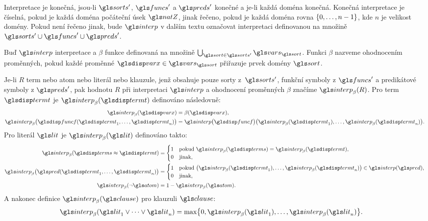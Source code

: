Interpretace je konečná, jsou-li $\sorts'$, $\funcs'$ a $\preds'$
konečné a je-li každá doména konečná.
Konečná interpretace je číselná, pokud je každá doména
počáteční úsek $\natZ$, jinak řečeno, pokud je každá doména rovna
$\{ 0 , \ldots, n - 1 \}$, kde $n$ je velikost domény.
Pokud není řečeno jinak, bude
$\interp$ v dalším textu označovat interpretaci definovanou
na množině $\sorts' \cup \funcs' \cup \preds'$.

Buď $\interp$ interpretace a $\beta$ funkce definovaná na množině
$\bigcup_{\sort \in \sorts'} \vars_\sort$. Funkci $\beta$ nazveme ohodnocením
proměnných, pokud každé proměnné $\var \in \vars_\sort$ přiřazuje
prvek domény $\sort$.

Je-li $R$ term nebo atom nebo literál nebo klauzule, jenž
obsahuje pouze sorty z~$\sorts'$, funkční symboly z $\funcs'$ a
predikátové symboly z $\preds'$, pak
hodnotu $R$ při interpretaci $\interp$ a ohodnocení proměnných
$\beta$ značíme $\interp_\beta(R)$. Pro term $\term$ je $\interp_\beta(\term)$
definováno následovně:
\begin{align*}
\interp_\beta(\var) &= \beta(\var), \\
\interp_\beta\bigl(\func(\term_1 \comdots \term_n)\bigr) &=
  \interp\bigl(\func\bigr)\bigl(\interp_\beta(\term_1) \comdots
    \interp_\beta(\term_n)\bigr).
\end{align*}
Pro literál $\lit$ je $\interp_\beta(\lit)$ definováno takto:
\begin{align*}
\interp_\beta(\termS \approx \term) &=
  \begin{cases}
    1 & \text{pokud } \interp_\beta(\termS) = \interp_\beta(\term), \\
    0 & \text{jinak},
  \end{cases} \\
\interp_\beta\bigl(\pred(\term_1 \comdots \term_n)\bigr) &=
  \begin{cases}
    1 & \text{pokud }
      \bigl(\interp_\beta(\term_1) \comdots \interp_\beta(\term_n)\bigr)
      \in \interp(\pred), \\
    0 & \text{jinak},
  \end{cases} \\
\interp_\beta(\neg \atom) &= 1 - \interp_\beta(\atom).
\end{align*}
A nakonec definice $\interp_\beta(\clause)$ pro klauzuli $\clause$:
\begin{align*}
\interp_\beta(\lit_1 \vee \cdots \vee \lit_n) &=
  \max \bigl\{ 0, \interp_\beta(\lit_1) \comdots \interp_\beta(\lit_n) \bigr\}.
\end{align*}

